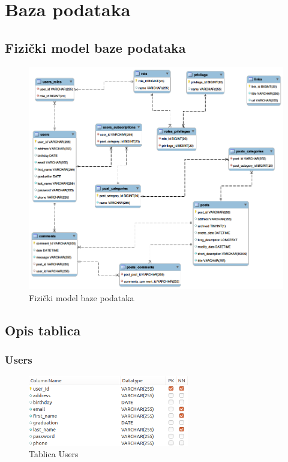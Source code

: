 \documentclass[zavrsni, numeric]{fer}
\begin{document}
\section{Baza podataka}
\subsection{Fizički model baze podataka}

\begin{figure}[H]
	\centering
	\includegraphics[width=13cm]{slike/fizicki-model.png}
	\caption{Fizički model baze podataka}
	\label{fig:fizicki-model}
\end{figure}

\subsection{Opis tablica}

\subsubsection{Users}

\begin{figure}[H]
	\centering
	\includegraphics[width=7cm]{slike/t-users.png}
	\caption{Tablica Users}
	\label{fig:t-users}
\end{figure}
\end{document}
